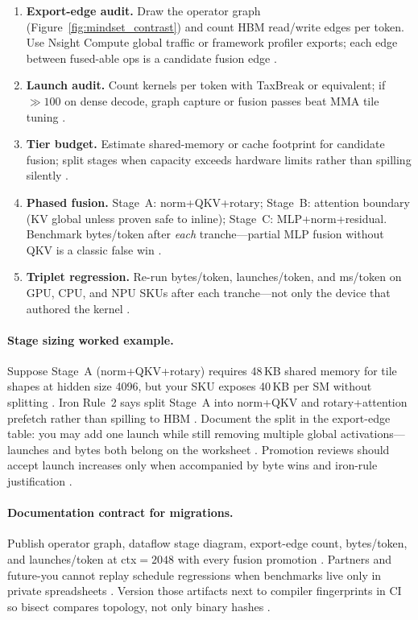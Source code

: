 \begin{enumerate}
\item \textbf{Export-edge audit.} Draw the operator graph (Figure~\ref{fig:mindset_contrast}) and count HBM read/write edges per token.
Use Nsight Compute global traffic or framework profiler exports; each edge between fused-able ops is a candidate fusion edge \citep{memoryfloor2026}.

\item \textbf{Launch audit.} Count kernels per token with TaxBreak or equivalent; if ${\gg}100$ on dense decode, graph capture or fusion passes beat MMA tile tuning \citep{taxbreak2026}.

\item \textbf{Tier budget.} Estimate shared-memory or cache footprint for candidate fusion; split stages when capacity exceeds hardware limits rather than spilling silently \citep{yirage2026}.

\item \textbf{Phased fusion.} Stage~A: norm+QKV+rotary; Stage~B: attention boundary (KV global unless proven safe to inline); Stage~C: MLP+norm+residual.
Benchmark bytes/token after \emph{each} tranche---partial MLP fusion without QKV is a classic false win \citep{memoryfloor2026,taxbreak2026}.

\item \textbf{Triplet regression.} Re-run bytes/token, launches/token, and ms/token on GPU, CPU, and NPU SKUs after each tranche---not only the device that authored the kernel \citep{amd2024xdna,yirage2026}.
\end{enumerate}

\paragraph{Stage sizing worked example.}
Suppose Stage~A (norm+QKV+rotary) requires 48\,KB shared memory for tile shapes at hidden size 4096, but your SKU exposes 40\,KB per SM without splitting \citep{nvidia2022hopper}.
Iron Rule~2 says split Stage~A into norm+QKV and rotary+attention prefetch rather than spilling to HBM \citep{yirage2026}.
Document the split in the export-edge table: you may add one launch while still removing multiple global activations---launches and bytes both belong on the worksheet \citep{taxbreak2026,memoryfloor2026}.
Promotion reviews should accept launch increases only when accompanied by byte wins and iron-rule justification \citep{patel2025llminference}.

\paragraph{Documentation contract for migrations.}
Publish operator graph, dataflow stage diagram, export-edge count, bytes/token, and launches/token at ctx${=}2048$ with every fusion promotion \citep{taxbreak2026,memoryfloor2026}.
Partners and future-you cannot replay schedule regressions when benchmarks live only in private spreadsheets \citep{yirage2026}.
Version those artifacts next to compiler fingerprints in CI so bisect compares topology, not only binary hashes \citep{chen2020compilerbasedhardw}.


